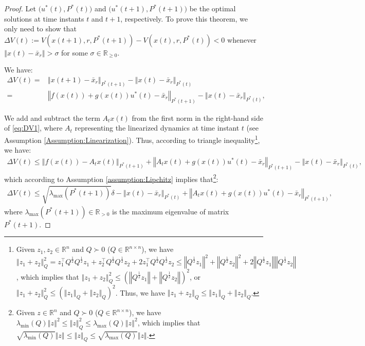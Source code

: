 \documentclass[1p,times]{elsarticle}
\begin{document}
\begin{proof}
Let $\big(u^\ast(t),P^\ast(t)\big)$ and  $\big(u^\ast(t+1),P^\ast(t+1)\big)$ be the optimal solutions at time instants $t$ and $t+1$, respectively. To prove this theorem, we only need to show that $\Delta V(t):=V\left(x(t+1),r,P^\ast(t+1)\right)-V\left(x(t),r,P^\ast(t)\right)<0$ whenever $\left\Vert x(t)-\bar{x}_r\right\Vert>\sigma$ for some $\sigma\in\mathbb{R}_{\geq0}$. 


We have:
\begin{align}\label{eq:DV1}
\Delta V(t)=&\left\Vert x(t+1)-\bar{x}_r\right\Vert_{P^\ast(t+1)}-\left\Vert x(t)-\bar{x}_r\right\Vert_{P^\ast(t)}\nonumber\\
=&\left\Vert f\left(x(t)\right)+g\left(x(t)\right)u^\ast(t)-\bar{x}_r\right\Vert_{P^\ast(t+1)}-\left\Vert x(t)-\bar{x}_r\right\Vert_{P^\ast(t)},
\end{align}


We add and subtract the term $A_tx(t)$ from the first norm in the right-hand side of \eqref{eq:DV1}, where $A_t$ representing the linearized dynamics at time instant $t$ (see Assumption \ref{Assumption:Linearization}). Thus, according to triangle inequality\footnote{Given $z_1,z_2\in\mathbb{R}^n$ and $Q\succ0$ ($Q\in\mathbb{R}^{n\times n}$), we have $\left\Vert z_1+z_2\right\Vert_Q^2=z_1^\top Q^{\frac{1}{2}}Q^{\frac{1}{2}}z_1+z_2^\top Q^{\frac{1}{2}}Q^{\frac{1}{2}}z_2+2z_1^\top Q^{\frac{1}{2}}Q^{\frac{1}{2}}z_2\leq\left\Vert Q^{\frac{1}{2}}z_1\right\Vert^2+\left\Vert Q^{\frac{1}{2}}z_2\right\Vert^2+2\left\Vert Q^{\frac{1}{2}}z_1\right\Vert\left\Vert Q^{\frac{1}{2}}z_2\right\Vert$, which implies that $\left\Vert z_1+z_2\right\Vert_Q^2\leq\left(\left\Vert Q^{\frac{1}{2}}z_1\right\Vert+\left\Vert Q^{\frac{1}{2}}z_2\right\Vert\right)^2$, or $\left\Vert z_1+z_2\right\Vert_Q^2\leq\left(\left\Vert z_1\right\Vert_Q+\left\Vert z_2\right\Vert_Q\right)^2$. Thus, we have $\left\Vert z_1+z_2\right\Vert_Q\leq\left\Vert z_1\right\Vert_Q+\left\Vert z_2\right\Vert_Q$.}, we have:
\begin{align}\label{eq:DV2}
\Delta V(t)\leq \left\Vert f\left(x(t)\right)-A_tx(t)\right\Vert_{P^\ast(t+1)}
+\left\Vert A_tx(t)+g\left(x(t)\right)u^\ast(t)-\bar{x}_r\right\Vert_{P^\ast(t+1)}
-\left\Vert x(t)-\bar{x}_r\right\Vert_{P^\ast(t)},
\end{align}
which according to Assumption \ref{assumption:Lipchitz} implies that\footnote{Given $z\in\mathbb{R}^n$ and $Q\succ0$ ($Q\in\mathbb{R}^{n\times n}$), we have $\lambda_{\min}(Q)\left\Vert z\right\Vert^2\leq\left\Vert z\right\Vert_Q^2\leq\lambda_{\max}(Q)\left\Vert z\right\Vert^2$, which implies that $\sqrt{\lambda_{\min}(Q)}\left\Vert z\right\Vert\leq\left\Vert z\right\Vert_Q\leq\sqrt{\lambda_{\max}(Q)}\left\Vert z\right\Vert$.}:
\begin{align}\label{eq:DV2}
\Delta V(t)\leq\sqrt{\lambda_{\text{max}}\left(P^\ast(t+1)\right)}\delta-\left\Vert x(t)-\bar{x}_r\right\Vert_{P^\ast(t)}
+\left\Vert A_tx(t)+g\left(x(t)\right)u^\ast(t)-\bar{x}_r\right\Vert_{P^\ast(t+1)},
\end{align}
where $\lambda_{\text{max}}\left(P^\ast(t+1)\right)\in\mathbb{R}_{>0}$ is the maximum eigenvalue of matrix $P^\ast(t+1)$. 


\end{proof}
\end{document}
